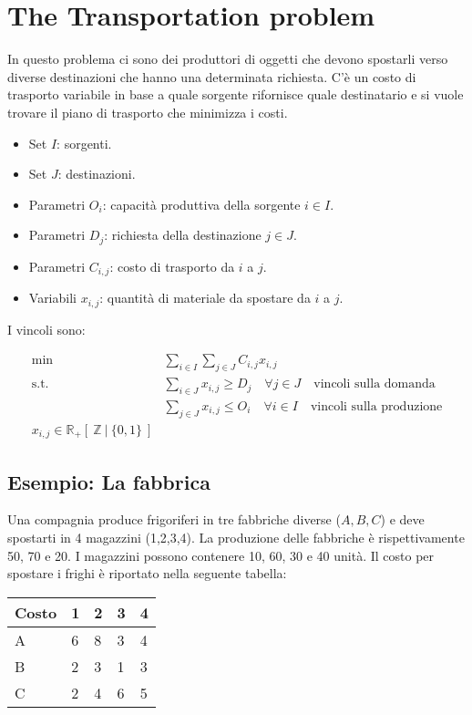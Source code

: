 \section{The Transportation problem}

In questo problema ci sono dei produttori di oggetti che devono spostarli verso diverse destinazioni che hanno una determinata richiesta. C'è un costo di trasporto variabile in base a quale sorgente rifornisce quale destinatario e si vuole trovare il piano di trasporto che minimizza i costi.

\begin{itemize}
	\item Set $I$: sorgenti.
	\item Set $J$: destinazioni.
	\item Parametri $O_i$: capacità produttiva della sorgente $i \in I$.
	\item Parametri $D_j$: richiesta della destinazione $j \in J$.
	\item Parametri $C_{i,j}$: costo di trasporto da $i$ a $j$.
	\item Variabili $x_{i,j}$: quantità di materiale da spostare da $i$ a $j$.
\end{itemize}

I vincoli sono:

\begin{align*}
	\min \: & \sum\limits_{i \in I} \sum\limits_{j \in J} C_{i,j} x_{i,j} \\
	\text{s.t. }& \sum\limits_{i \in J} x_{i,j} \geq D_j \quad \forall j \in J \quad \text{vincoli sulla domanda} \\
	& \sum\limits_{j \in J} x_{i,j} \leq O_i \quad \forall i \in I \quad \text{vincoli sulla produzione} \\
	x_{i,j} \in \mathbb{R}_+ [\:\mathbb{Z} \:|\: \{0,1\} \:]
\end{align*}

\subsection{Esempio: La fabbrica}

Una compagnia produce frigoriferi in tre fabbriche diverse ($A, B, C$) e deve spostarti in 4 magazzini (1,2,3,4). La produzione delle fabbriche è rispettivamente 50, 70 e 20. I magazzini possono contenere 10, 60, 30 e 40 unità. Il costo per spostare i frighi è riportato nella seguente tabella:

\begin{table}[htbp]
	\centering
	\begin{tabular}{|l|l|l|l|l|}
		\hline
		Costo & 1 & 2 & 3 & 4 \\ \hline
		A    & 6 & 8 & 3 & 4\\ \hline
		B    &2 & 3 & 1 &3\\ \hline
		C    & 2 & 4 & 6 &5\\ \hline
	\end{tabular}
\end{table}

